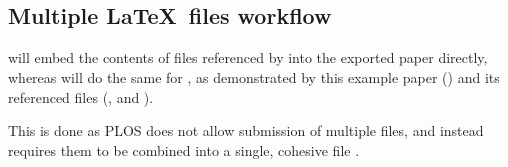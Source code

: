 \subsection*{Multiple \LaTeX~files workflow}

 will embed the contents of files referenced by \verb|| into the exported paper directly, whereas  will do the same for \verb||, as demonstrated by this example paper () and its referenced  files (,   and ).

This is done as PLOS does not allow submission of multiple  files, and instead requires them to be combined into a single, cohesive  file \cite{PLOS:LaTeX}.
